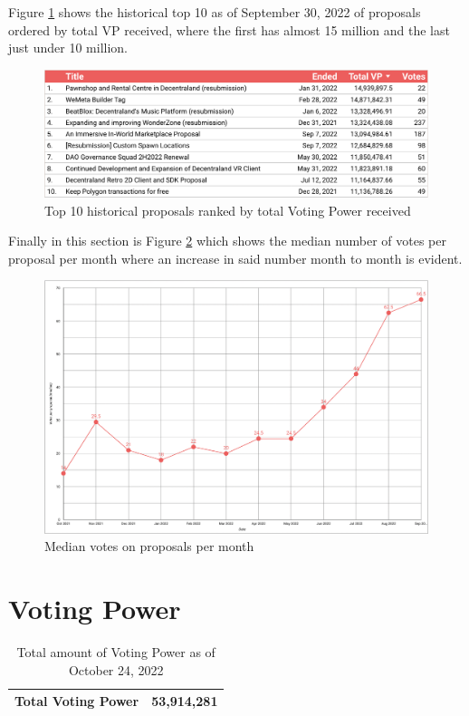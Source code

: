 \documentclass[MSE,Master,english]{twbook}%
\begin{document}
Figure \ref{fig:top_proposals} shows the historical top 10 as of September 30, 2022 of proposals ordered by total VP received, where the first has almost 15 million and the last just under 10 million.
\begin{figure}[H]
  \centering
  \includegraphics[width=\textwidth]{metrics/top_proposals.png}
  \caption{Top 10 historical proposals ranked by total Voting Power received}
  \label{fig:top_proposals}
\end{figure}

Finally in this section is Figure \ref{fig:median_votes} which shows the median number of votes per proposal per month where an increase in said number month to month is evident.
\begin{figure}[H]
  \centering
  \includegraphics[width=\textwidth]{metrics/median_votes.png}
  \caption{Median votes on proposals per month}
  \label{fig:median_votes}
\end{figure}


\section{Voting Power}
\begin{center}
  \begin{table}[H]
    \begin{tabular}{ | m{20em} | m{20em} | }
      \hline
      \textbf{Total Voting Power} & 53,914,281 \\
      \hline
    \end{tabular}
    \caption{Total amount of Voting Power as of October 24, 2022}
    \label{table:VP}
  \end{table}
\end{center}
\end{document}
